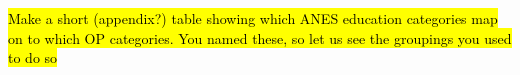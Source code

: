 \documentclass[12pt]{article}
\begin{document}
\begin{coi}
		\item \hl{Make a short (appendix?) table showing which ANES education categories map on to which OP categories. You named these, so let us see the groupings you used to do so}
	\end{coi}
	
	
	
\end{document}
